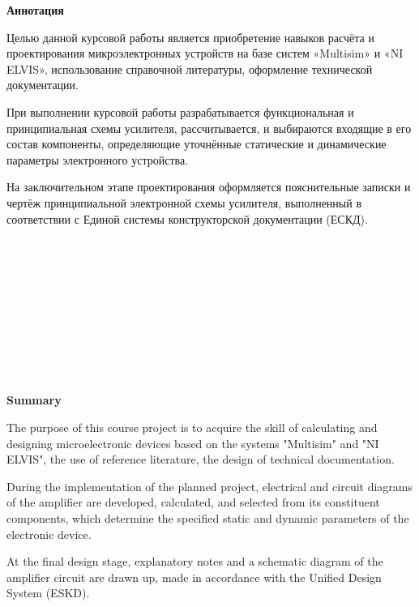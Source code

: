 \begin{center}
	\Large{
		\textbf{Аннотация}
	}
\end{center}

Целью данной курсовой работы является приобретение навыков расчёта 
и проектирования микроэлектронных устройств на базе систем «Multisim» 
и «NI ELVIS», использование справочной литературы, 
оформление технической документации.

При выполнении курсовой работы разрабатывается функциональная 
и принципиальная схемы усилителя, рассчитывается, 
и выбираются входящие в его состав компоненты, 
определяющие уточнённые статические и динамические параметры 
электронного устройства.

На заключительном этапе проектирования оформляется пояснительные 
записки и чертёж принципиальной электронной схемы усилителя, 
выполненный в соответствии с Единой системы конструкторской 
документации (ЕСКД). 

\\
\\
\\
\\
\\
\\
\\
\\
\\
\begin{center}
	\Large{
		\textbf{Summary}
	}
\end{center}

The purpose of this course project is to acquire the skill 
of calculating and designing microelectronic devices based 
on the systems "Multisim" and "NI ELVIS", the use of reference 
literature, the design of technical documentation.

During the implementation of the planned project, electrical 
and circuit diagrams of the amplifier are developed, calculated, 
and selected from its constituent components, which determine 
the specified static and dynamic parameters of the electronic device.

At the final design stage, explanatory notes and a schematic 
diagram of the amplifier circuit are drawn up, made in accordance 
with the Unified Design System (ESKD).
